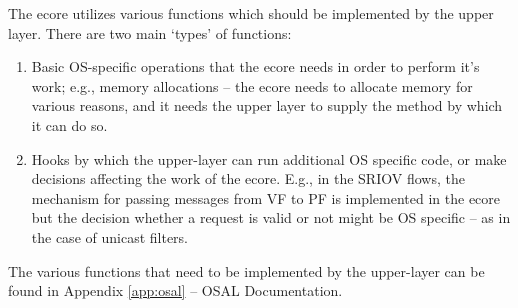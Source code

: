 \documentclass[11pt,fleqn,hidelinks,oneside]{book} %
\begin{document}

The ecore utilizes various functions which should be implemented by the upper layer. There are two main ‘types’ of functions:
\begin{enumerate}
	\item Basic OS-specific operations that the ecore needs in order to perform it’s work; e.g., memory allocations – the ecore needs to allocate memory for various reasons, and it needs the upper layer to supply the method by which it can do so.
	\item Hooks by which the upper-layer can run additional OS specific code, or make decisions affecting the work of the ecore. E.g., in the SRIOV flows, the mechanism for passing messages from VF to PF is implemented in the ecore but the decision whether a request is valid or not might be OS specific – as in the case of unicast filters.
\end{enumerate}

The various functions that need to be implemented by the upper-layer can be found in Appendix \ref{app:osal} -- OSAL Documentation.
\end{document}
